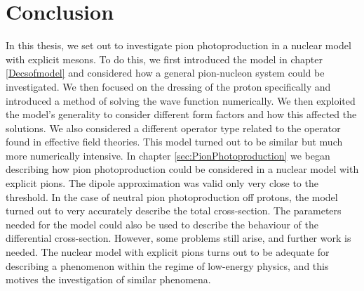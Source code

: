 \chapter{Conclusion}
In this thesis, we set out to investigate pion photoproduction in a nuclear model with explicit mesons. To do this, we first introduced the model in chapter \ref{Decsofmodel} and considered how a general pion-nucleon system could be investigated. We then focused on the dressing of the proton specifically and introduced a method of solving the wave function numerically. We then exploited the model's generality to consider different form factors and how this affected the solutions. We also considered a different operator type related to the operator found in effective field theories. This model turned out to be similar but much more numerically intensive. 
In chapter \ref{sec:PionPhotoproduction} we began describing how pion photoproduction could be considered in a nuclear model with explicit pions. The dipole approximation was valid only very close to the threshold. In the case of neutral pion photoproduction off protons, the model turned out to very accurately describe the total cross-section. The parameters needed for the model could also be used to describe the behaviour of the differential cross-section. However, some problems still arise, and further work is needed. The nuclear model with explicit pions turns out to be adequate for describing a phenomenon within the regime of low-energy physics, and this motives the investigation of similar phenomena.
